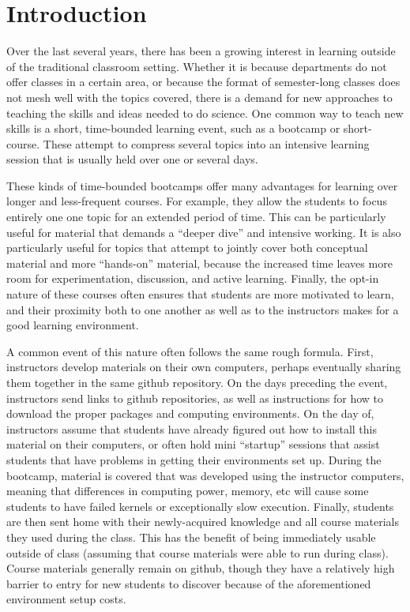 \section{Introduction}

Over the last several years, there has been a growing interest in learning
outside of the traditional classroom setting. Whether it is because departments
do not offer classes in a certain area, or because the format of semester-long
classes does not mesh well with the topics covered, there is a demand for new
approaches to teaching the skills and ideas needed to do science. One common way
to teach new skills is a short, time-bounded learning event, such as a bootcamp
or short-course. These attempt to compress several topics into an intensive
learning session that is usually held over one or several days.

These kinds of time-bounded bootcamps offer many advantages for learning over
longer and less-frequent courses. For example, they allow the students to focus
entirely one one topic for an extended period of time. This can be particularly
useful for material that demands a ``deeper dive'' and intensive working. It is
also particularly useful for topics that attempt to jointly cover both
conceptual material and more ``hands-on'' material, because the increased time
leaves more room for experimentation, discussion, and active learning. Finally,
the opt-in nature of these courses often ensures that students are more
motivated to learn, and their proximity both to one another as well as to the
instructors makes for a good learning environment.

A common event of this nature often follows the same rough formula. First,
instructors develop materials on their own computers, perhaps eventually sharing
them together in the same github repository. On the days preceding the event,
instructors send links to github repositories, as well as instructions for how
to download the proper packages and computing environments. On the day of,
instructors assume that students have already figured out how to install this
material on their computers, or often hold mini ``startup'' sessions that assist
students that have problems in getting their environments set up. During the
bootcamp, material is covered that was developed using the instructor computers,
meaning that differences in computing power, memory, etc will cause some
students to have failed kernels or exceptionally slow execution. Finally,
students are then sent home with their newly-acquired knowledge and all course
materials they used during the class. This has the benefit of being immediately
usable outside of class (assuming that course materials were able to run during
class). Course materials generally remain on github, though they have a
relatively high barrier to entry for new students to discover because of the
aforementioned environment setup costs.

